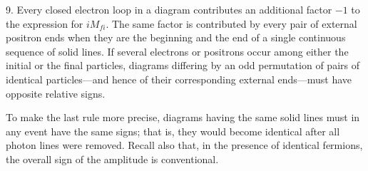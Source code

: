 9. Every closed electron loop in a diagram contributes an additional factor $-1$ to the expression for $iM_{fi}$. The same factor is contributed by every pair of external positron ends when they are the beginning and the end of a single continuous sequence of solid lines. If several electrons or positrons occur among either the initial or the final particles, diagrams differing by an odd permutation of pairs of identical particles---and hence of their corresponding external ends---must have opposite relative signs.

To make the last rule more precise, diagrams having the same solid lines must in any event have the same signs; that is, they would become identical after all photon lines were removed. Recall also that, in the presence of identical fermions, the overall sign of the amplitude is conventional.
